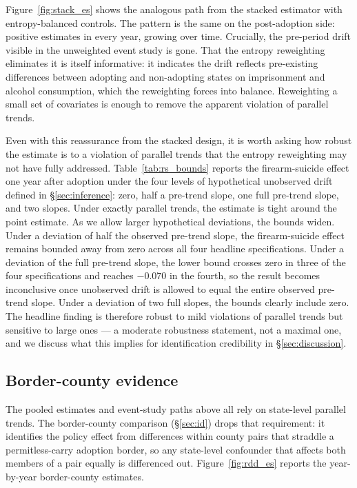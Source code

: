 \documentclass[12pt]{article}
\begin{document}
Figure~\ref{fig:stack_es} shows the analogous path from the
stacked estimator with entropy-balanced controls. The pattern is
the same on the post-adoption side: positive estimates in every
year, growing over time. Crucially, the pre-period drift visible
in the unweighted event study is gone. That the entropy reweighting
eliminates it is itself informative: it indicates the drift
reflects pre-existing differences between adopting and non-adopting
states on imprisonment and alcohol consumption, which the
reweighting forces into balance. Reweighting a small set of
covariates is enough to remove the apparent violation of parallel
trends.


Even with this reassurance from the stacked design, it is worth
asking how robust the \citeauthor{callaway2021} estimate is to a
violation of parallel trends that the entropy reweighting may not
have fully addressed. Table~\ref{tab:rs_bounds} reports the
firearm-suicide effect one year after adoption under the four
levels of hypothetical unobserved drift defined in
§\ref{sec:inference}: zero, half a pre-trend slope, one full
pre-trend slope, and two slopes. Under exactly parallel trends, the
estimate is tight around the point estimate. As we allow larger
hypothetical deviations, the bounds widen. Under a deviation of
half the observed pre-trend slope, the firearm-suicide effect
remains bounded away from zero across all four headline
specifications. Under a deviation of the full pre-trend slope, the
lower bound crosses zero in three of the four specifications and
reaches $-0.070$ in the fourth, so the result becomes inconclusive
once unobserved drift is allowed to equal the entire observed
pre-trend slope. Under a deviation of two full slopes, the bounds
clearly include zero. The headline finding is therefore robust to
mild violations of parallel trends but sensitive to large ones ---
a moderate robustness statement, not a maximal one, and we
discuss what this implies for identification credibility in
§\ref{sec:discussion}.


\subsection{Border-county evidence}\label{sec:resrdd}

The pooled estimates and event-study paths above all rely on
state-level parallel trends. The border-county comparison
(§\ref{sec:id}) drops that requirement: it identifies the policy
effect from differences within county pairs that straddle a
permitless-carry adoption border, so any state-level confounder
that affects both members of a pair equally is differenced out.
Figure~\ref{fig:rdd_es} reports the year-by-year border-county
estimates.
\end{document}
